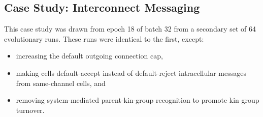 \subsection{Case Study: Interconnect Messaging}



This case study was drawn from epoch 18 of batch 32 from a secondary set of 64 evolutionary runs.
These runs were identical to the first, except:
\begin{itemize}
  \item increasing the default outgoing connection cap,
  \item making cells default-accept instead of default-reject intracellular messages from same-channel cells, and
  \item removing system-mediated parent-kin-group recognition to promote kin group turnover.
\end{itemize}

